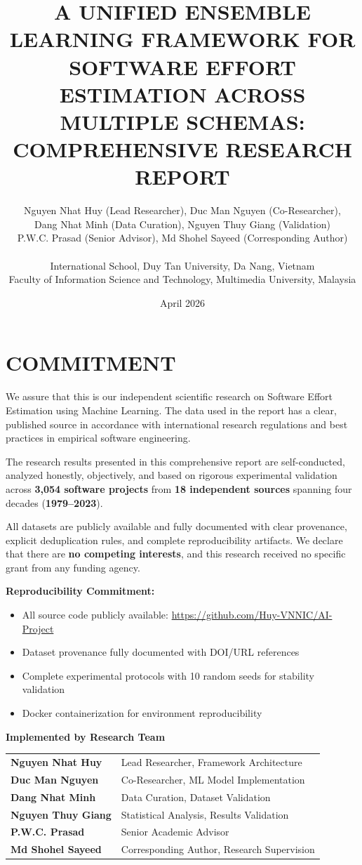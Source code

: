 \documentclass[11pt,a4paper]{article}
\title{\textbf{A UNIFIED ENSEMBLE LEARNING FRAMEWORK FOR\\SOFTWARE EFFORT ESTIMATION ACROSS MULTIPLE SCHEMAS:\\COMPREHENSIVE RESEARCH REPORT}}
\author{
Nguyen Nhat Huy (Lead Researcher), Duc Man Nguyen (Co-Researcher),\\ 
Dang Nhat Minh (Data Curation), Nguyen Thuy Giang (Validation)\\
P.W.C. Prasad (Senior Advisor), Md Shohel Sayeed (Corresponding Author)\\
\\
\small International School, Duy Tan University, Da Nang, Vietnam\\
\small Faculty of Information Science and Technology, Multimedia University, Malaysia
}
\date{April 2026}
\begin{document}
\maketitle
\thispagestyle{empty}

\newpage
\section*{COMMITMENT}

We assure that this is our independent scientific research on Software Effort Estimation using Machine Learning. The data used in the report has a clear, published source in accordance with international research regulations and best practices in empirical software engineering.

The research results presented in this comprehensive report are self-conducted, analyzed honestly, objectively, and based on rigorous experimental validation across \textbf{3,054 software projects} from \textbf{18 independent sources} spanning four decades (\textbf{1979--2023}).

All datasets are publicly available and fully documented with clear provenance, explicit deduplication rules, and complete reproducibility artifacts. We declare that there are \textbf{no competing interests}, and this research received no specific grant from any funding agency.

\textbf{Reproducibility Commitment:}
\begin{itemize}
    \item All source code publicly available: \url{https://github.com/Huy-VNNIC/AI-Project}
    \item Dataset provenance fully documented with DOI/URL references
    \item Complete experimental protocols with 10 random seeds for stability validation
    \item Docker containerization for environment reproducibility
\end{itemize}

\vspace{2cm}

\noindent \textbf{Implemented by Research Team}\\
\vspace{0.5cm}

\begin{tabular}{ll}
\textbf{Nguyen Nhat Huy} & Lead Researcher, Framework Architecture \\
\textbf{Duc Man Nguyen} & Co-Researcher, ML Model Implementation \\
\textbf{Dang Nhat Minh} & Data Curation, Dataset Validation \\
\textbf{Nguyen Thuy Giang} & Statistical Analysis, Results Validation \\
\textbf{P.W.C. Prasad} & Senior Academic Advisor \\
\textbf{Md Shohel Sayeed} & Corresponding Author, Research Supervision \\
\end{tabular}
\end{document}
